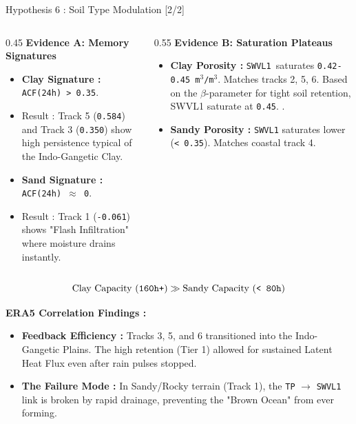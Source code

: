 \begin{frame}{Hypothesis 6 : Soil Type Modulation [2/2]}
	\footnotesize
	\vspace{-0.1cm}
	\begin{columns}
		\begin{column}{0.45\textwidth}
			\textbf{Evidence A: Memory Signatures}
			\begin{itemize}
				\item \textbf{Clay Signature :} \texttt{ACF(24h) > 0.35}.
				\item Result : Track 5 (\texttt{0.584}) and Track 3 (\texttt{0.350}) show high persistence typical of the Indo-Gangetic Clay.
				\item \textbf{Sand Signature :} \texttt{ACF(24h) $\approx$ 0}.
				\item Result : Track 1 (\texttt{-0.061}) shows "Flash Infiltration" where moisture drains instantly.
			\end{itemize}
		\end{column}

		\begin{column}{0.55\textwidth}
			\textbf{Evidence B: Saturation Plateaus}
			\begin{itemize}
				\item \textbf{Clay Porosity :} \texttt{SWVL1 }saturates \texttt{0.42-0.45 m$^3$/m$^3$}. Matches tracks 2, 5, 6. Based on the $\beta$-parameter for tight soil retention, SWVL1 saturate at \texttt{0.45}. \cite{clapp1978empirical}.
				\item \textbf{Sandy Porosity :} \texttt{SWVL1} saturates lower (\texttt{< 0.35}). Matches coastal track 4.
			\end{itemize}
		\end{column}
	\end{columns}

	\vspace{0.2cm}
	\begin{equation*}
		\text{Clay Capacity (\texttt{160h+})} \gg \text{Sandy Capacity (\texttt{< 80h})}
	\end{equation*}

	\vspace{0.1cm}
	\footnotesize
	\textbf{ERA5 Correlation Findings :}
	\begin{itemize}
		\item \textbf{Feedback Efficiency :} Tracks 3, 5, and 6 transitioned into the Indo-Gangetic Plains. The high retention (Tier 1) allowed for sustained Latent Heat Flux even after rain pulses stopped.
		\item \textbf{The Failure Mode :} In Sandy/Rocky terrain (Track 1), the \texttt{TP} $\rightarrow$ \texttt{SWVL1} link is broken by rapid drainage, preventing the "Brown Ocean" from ever forming. \cite{wakefield2021}
	\end{itemize}
\end{frame}

